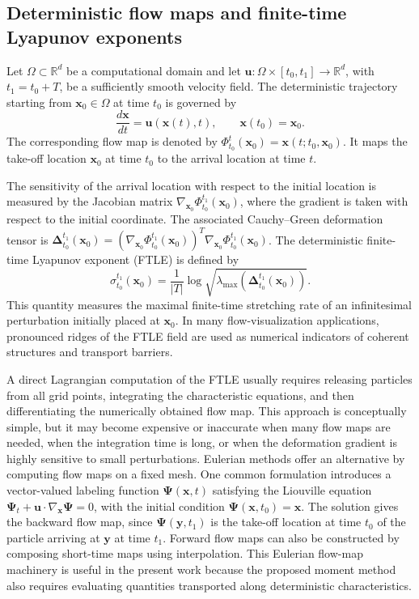 \documentclass[a4paper,11pt]{article}
\numberwithin{equation}{section}
\theoremstyle{plain}
\theoremstyle{definition}
\theoremstyle{remark}
\newcommand{\R}{\mathbb{R}}
\newcommand{\bx}{\mathbf{x}}
\newcommand{\by}{\mathbf{y}}
\newcommand{\bu}{\mathbf{u}}
\newcommand{\bDelta}{\boldsymbol{\Delta}}
\newcommand{\bPsi}{\boldsymbol{\Psi}}
\begin{document}
\subsection{Deterministic flow maps and finite-time Lyapunov exponents}

Let \(\Omega\subset\R^d\) be a computational domain and let \(\bu:\Omega\times[t_0,t_1]\to\R^d\), with \(t_1=t_0+T\), be a sufficiently smooth velocity field.  The deterministic trajectory starting from \(\bx_0\in\Omega\) at time \(t_0\) is governed by
\begin{equation}
    \frac{d\bx}{dt}=\bu(\bx(t),t),
    \qquad \bx(t_0)=\bx_0 .
    \label{eq:det_ode}
\end{equation}
The corresponding flow map is denoted by \(\Phi_{t_0}^{t}(\bx_0)=\bx(t;t_0,\bx_0)\).  It maps the take-off location \(\bx_0\) at time \(t_0\) to the arrival location at time \(t\).

The sensitivity of the arrival location with respect to the initial location is measured by the Jacobian matrix \(\nabla_{\bx_0}\Phi_{t_0}^{t_1}(\bx_0)\), where the gradient is taken with respect to the initial coordinate.  The associated Cauchy--Green deformation tensor is \(\bDelta_{t_0}^{t_1}(\bx_0)=(\nabla_{\bx_0}\Phi_{t_0}^{t_1}(\bx_0))^T\nabla_{\bx_0}\Phi_{t_0}^{t_1}(\bx_0)\).  The deterministic finite-time Lyapunov exponent (FTLE) is defined by
\[
    \sigma_{t_0}^{t_1}(\bx_0)=\frac{1}{|T|}\log\sqrt{\lambda_{\max}\left(\bDelta_{t_0}^{t_1}(\bx_0)\right)}.
\]
This quantity measures the maximal finite-time stretching rate of an infinitesimal perturbation initially placed at \(\bx_0\).  In many flow-visualization applications, pronounced ridges of the FTLE field are used as numerical indicators of coherent structures and transport barriers.

A direct Lagrangian computation of the FTLE usually requires releasing particles from all grid points, integrating the characteristic equations, and then differentiating the numerically obtained flow map.  This approach is conceptually simple, but it may become expensive or inaccurate when many flow maps are needed, when the integration time is long, or when the deformation gradient is highly sensitive to small perturbations.  Eulerian methods offer an alternative by computing flow maps on a fixed mesh.  One common formulation introduces a vector-valued labeling function \(\bPsi(\bx,t)\) satisfying the Liouville equation \(\bPsi_t+\bu\cdot\nabla_{\bx}\bPsi=0\), with the initial condition \(\bPsi(\bx,t_0)=\bx\).  The solution gives the backward flow map, since \(\bPsi(\by,t_1)\) is the take-off location at time \(t_0\) of the particle arriving at \(\by\) at time \(t_1\).  Forward flow maps can also be constructed by composing short-time maps using interpolation.  This Eulerian flow-map machinery is useful in the present work because the proposed moment method also requires evaluating quantities transported along deterministic characteristics.
\end{document}
